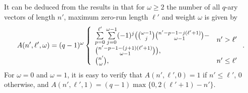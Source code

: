 \documentclass[a4paper]{llncs}
\begin{document}
	It can be deduced from the results in \cite{Kurmaev11} that for $\omega\geq 2$ the number of all $q$-ary vectors of length $n'$, maximum zero-run length $\ell'$ and weight $\omega$ is given by
	\begin{equation*}
	A(n',\ell',\omega) = (q-1)^\omega \left\{ \begin{array}{ll}  \sum\limits_{p=0}^{\ell'}\sum\limits_{j=0}^{\omega-1}  (-1)^j \big( 
	\binom{\omega-1}{j}
	\binom{n'-p-1-j(\ell'+1)}{\omega-1}- & \multirow{2}{*}{$n'>\ell'$} \\ \binom{n'-p-1-(j+1)(\ell'+1)}{\omega-1}\big), &  \\
	\binom{n'}{\omega}, & n'\leq \ell'
	\end{array} \right. .
	\end{equation*} 
	For $\omega=0$ and $\omega=1$, it is easy to verify that $A(n',\ell',0) = 1$ if $n'\leq \ell'$, $0$ otherwise, and $A(n',\ell',1) = (q-1)\max \{0, 2(\ell '+1)-n'\}$. 
\end{document}
